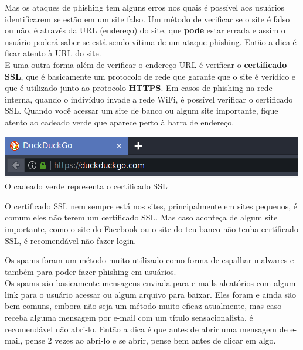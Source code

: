 \documentclass[12pt, letterpaper]{report}
\begin{document}
	Mas os ataques de phishing tem alguns erros nos quais é possível aos usuários identificarem se estão em um site falso. Um método de verificar se o site é falso ou não, é através da URL (endereço) do site, que \textbf{pode} estar errada e assim o usuário poderá saber se está sendo vítima de um ataque phishing. Então a dica é ficar atento à URL do site.\\

	E uma outra forma além de verificar o endereço URL é verificar o \textbf{certificado SSL}, que é basicamente um protocolo de rede que garante que o site é verídico e que é utilizado junto ao protocolo \textbf{HTTPS}. Em casos de phishing na rede interna, quando o indivíduo invade a rede WiFi, é possível verificar o certificado SSL. Quando você acessar um site de banco ou algum site importante, fique atento ao cadeado verde que aparece perto à barra de endereço.

	\begin{center} %
		\includegraphics[scale=1]{Duck.png}\\
		\footnotesize O cadeado verde representa o certificado SSL
	\end{center}

	O certificado SSL nem sempre está nos sites, principalmente em sites pequenos, é comum eles não terem um certificado SSL. Mas caso aconteça de algum site importante, como o site do Facebook ou o site do teu banco não tenha certíficado SSL, é recomendável não fazer login.\\

\pagebreak

	Os \href{https://criptowiki.miraheze.org/wiki/Spam}{spams} foram um método muito utilizado como forma de espalhar malwares e também para poder fazer phishing em usuários.\\

	Os spams são basicamente mensagens enviada para e-mails aleatórios com algum link para o usuário acessar ou algum arquivo para baixar. Eles foram e ainda são bem comuns, embora não seja um método muito eficaz atualmente, mas caso receba alguma mensagem por e-mail com um título sensacionalista, é recomendável não abri-lo. Então a dica é que antes de abrir uma mensagem de e-mail, pense 2 vezes ao abri-lo e se abrir, pense bem antes de clicar em algo.\\
\end{document}
